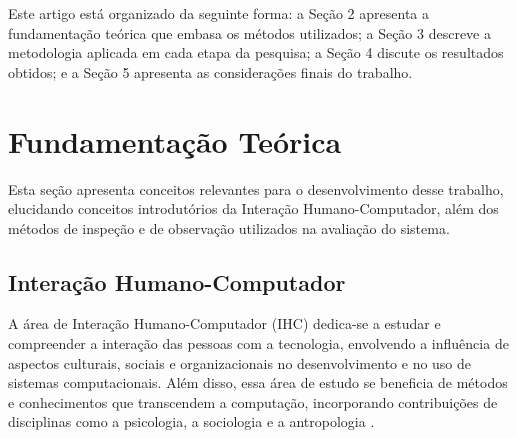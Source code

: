 \documentclass[12pt]{article}
\begin{document}
\begin{abstractp}
 Este artigo está organizado da seguinte forma: a Seção 2 apresenta a fundamentação teórica que embasa os métodos utilizados; a Seção 3 descreve a metodologia aplicada em cada etapa da pesquisa; a Seção 4 discute os resultados obtidos; e a Seção 5 apresenta as considerações finais do trabalho.
 
\section{Fundamentação Teórica} \label{sec:fundamentacao}

Esta seção apresenta conceitos relevantes para o desenvolvimento desse trabalho, elucidando conceitos introdutórios da Interação Humano-Computador, além dos métodos de inspeção e de observação utilizados na avaliação do sistema. 


\subsection{Interação Humano-Computador}
\label{sec:ihc}

A área de Interação Humano-Computador (IHC) dedica-se a estudar e compreender a interação das pessoas com a tecnologia, envolvendo a influência de aspectos culturais, sociais e organizacionais no desenvolvimento e no uso de sistemas computacionais. Além disso, essa área de estudo se beneficia de métodos e conhecimentos que transcendem a computação, incorporando contribuições de disciplinas como a psicologia, a sociologia e a antropologia \cite{barbosa2010ihc}.




\end{abstractp}
\end{document}
